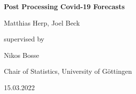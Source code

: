 \begin{titlepage}
  \begin{center}
    \vspace*{1cm}
    
    \Huge
    \textbf{Post Processing Covid-19 Forecasts}
    
    \vspace{1.5cm}
    
    Matthias Herp, Joel Beck
    
    \vspace{1.5cm}
    
    \Large
    supervised by
    
    \vspace{0.5cm}
    
    Nikos Bosse
    
    \vspace{2.5cm}
    
    Chair of Statistics, University of G\"ottingen
    
    \vspace{0.5cm}
    
    15.03.2022
            
  \end{center}
\end{titlepage}

\newpage

\renewcommand{\contentsname}{Table of Contents}
\setcounter{tocdepth}{2}
\tableofcontents

\newpage

